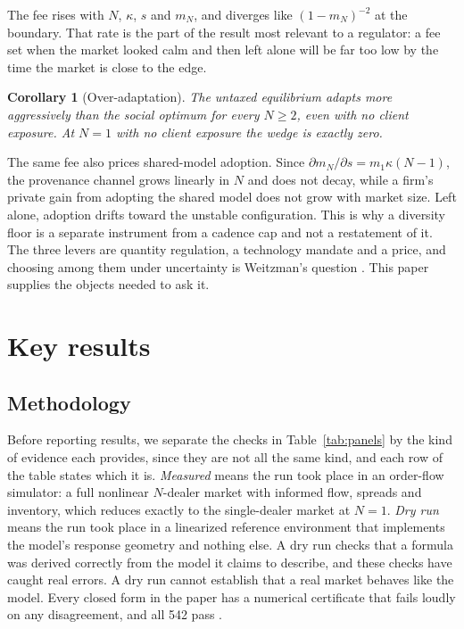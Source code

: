 \documentclass[conference]{IEEEtran}
\theoremstyle{plain}
\newtheorem{corollary}{Corollary}
\newcommand{\mN}{m_N}
\begin{document}
The fee rises with $N$, $\kappa$, $s$ and $\mN$, and diverges like $(1-\mN)^{-2}$ at the boundary. That rate is the part of the result most relevant to a regulator: a fee set when the market looked calm and then left alone will be far too low by the time the market is close to the edge.

\begin{corollary}[Over-adaptation]
\label{cor:over}
The untaxed equilibrium adapts more aggressively than the social optimum for every $N\ge2$, even with no client exposure. At $N=1$ with no client exposure the wedge is exactly zero.
\end{corollary}

The same fee also prices shared-model adoption. Since $\partial\mN/\partial s=m_1\kappa(N-1)$, the provenance channel grows linearly in $N$ and does not decay, while a firm's private gain from adopting the shared model does not grow with market size. Left alone, adoption drifts toward the unstable configuration. This is why a diversity floor is a separate instrument from a cadence cap and not a restatement of it. The three levers are quantity regulation, a technology mandate and a price, and choosing among them under uncertainty is Weitzman's question \cite{weitzman1974}. This paper supplies the objects needed to ask it.

\section{Key results}
\label{sec:evidence}

\subsection{Methodology}
Before reporting results, we separate the checks in Table~\ref{tab:panels} by the kind of evidence each provides, since they are not all the same kind, and each row of the table states which it is. \emph{Measured} means the run took place in an order-flow simulator: a full nonlinear $N$-dealer market with informed flow, spreads and inventory, which reduces exactly to the single-dealer market at $N=1$. \emph{Dry run} means the run took place in a linearized reference environment that implements the model's response geometry and nothing else. A dry run checks that a formula was derived correctly from the model it claims to describe, and these checks have caught real errors. A dry run cannot establish that a real market behaves like the model. Every closed form in the paper has a numerical certificate that fails loudly on any disagreement, and all 542 pass \cite{price2026}.
\end{document}
